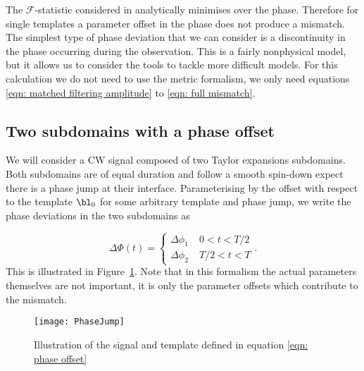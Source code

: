 The $\mathcal{F}$-statistic considered in \citet{Brady1998} analytically 
minimises over the phase. Therefore for single
templates a parameter offset in the phase
does not produce a mismatch. The simplest type of phase deviation that we can
consider is a discontinuity in the phase occurring during the observation. This 
is a fairly nonphysical model, but it allows us to consider the tools to 
tackle more difficult models. For this calculation we do not need to use the
metric formalism, we only need equations \eqref{eqn: matched filtering amplitude}
to \eqref{eqn: full mismatch}.

\subsection{Two subdomains with a phase offset}
\label{sec: Two subdomains with a phase offset}

We will consider a CW signal composed of two Taylor expansions subdomains.  Both
subdomains are of equal duration and follow a smooth spin-down expect there is a
phase jump at their interface. Parameterising by the offset with respect to
the template $\bl_{0}$ for some arbitrary template and phase jump, we write the
phase deviations in the two subdomains as

\begin{equation}
 \Delta\Phi(t) = \left\{
\begin{array}{cr}
\Delta \phi_{1}& \; 0 < t < T/2 \\
\Delta \phi_{2} & \;  T/2 < t < T 
\end{array}.
\right.
\label{eqn: phase offset}
\end{equation}
This is illustrated in Figure~\ref{fig: PhaseJump}. Note that in this formalism
the actual parameters themselves are not important, it is only the parameter
offsets which contribute to the mismatch.
\begin{figure}[htb]
    \centering
    \texttt{[image: PhaseJump]}
    \caption{Illustration of the signal and template defined in equation 
        \eqref{eqn: phase offset}}
    \label{fig: PhaseJump}
\end{figure}


